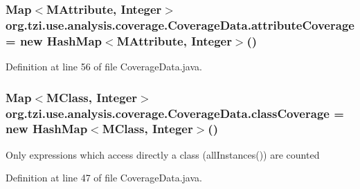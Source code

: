 \hypertarget{classorg_1_1tzi_1_1use_1_1analysis_1_1coverage_1_1_coverage_data_ab16587c58b3ae78ad31f55e6c8856492}{
\subsubsection[{attribute\-Coverage}]{\setlength{\rightskip}{0pt plus 5cm}Map$<${\bf M\-Attribute}, Integer$>$ org.\-tzi.\-use.\-analysis.\-coverage.\-Coverage\-Data.\-attribute\-Coverage = new Hash\-Map$<${\bf M\-Attribute}, Integer$>$()\hspace{0.3cm}{\ttfamily [protected]}}}\label{classorg_1_1tzi_1_1use_1_1analysis_1_1coverage_1_1_coverage_data_ab16587c58b3ae78ad31f55e6c8856492}


Definition at line 56 of file Coverage\-Data.\-java.

\hypertarget{classorg_1_1tzi_1_1use_1_1analysis_1_1coverage_1_1_coverage_data_a2c12dd4e26ecc1eab266e709d5cb1761}{
\subsubsection[{class\-Coverage}]{\setlength{\rightskip}{0pt plus 5cm}Map$<${\bf M\-Class}, Integer$>$ org.\-tzi.\-use.\-analysis.\-coverage.\-Coverage\-Data.\-class\-Coverage = new Hash\-Map$<${\bf M\-Class}, Integer$>$()\hspace{0.3cm}{\ttfamily [protected]}}}\label{classorg_1_1tzi_1_1use_1_1analysis_1_1coverage_1_1_coverage_data_a2c12dd4e26ecc1eab266e709d5cb1761}
Only expressions which access directly a class (all\-Instances()) are counted 

Definition at line 47 of file Coverage\-Data.\-java.

